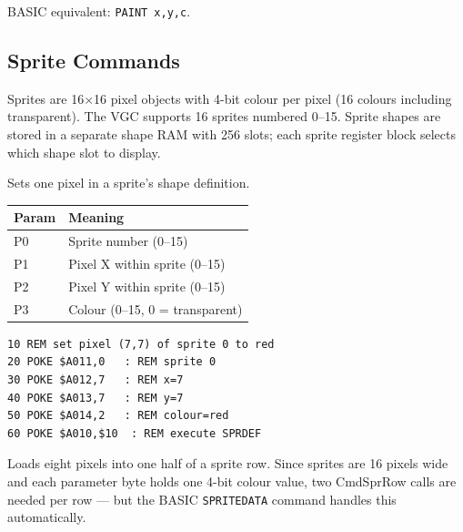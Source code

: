 \begin{notebox}
BASIC equivalent: \texttt{PAINT x,y,c}.
\end{notebox}


\subsection{Sprite Commands}
\label{sec:vgc-spr-cmds}

Sprites are 16$\times$16 pixel objects with 4-bit colour per pixel (16 colours
including transparent).  The VGC supports 16 sprites numbered 0--15.  Sprite
shapes are stored in a separate shape RAM with 256 slots; each sprite register
block selects which shape slot to display.



Sets one pixel in a sprite's shape definition.

\begin{center}
\small
\begin{tabular}{@{}ll@{}}
\toprule
\textbf{Param} & \textbf{Meaning} \\
\midrule
P0 & Sprite number (0--15) \\
P1 & Pixel X within sprite (0--15) \\
P2 & Pixel Y within sprite (0--15) \\
P3 & Colour (0--15, 0 = transparent) \\
\bottomrule
\end{tabular}
\end{center}

\begin{lstlisting}
10 REM set pixel (7,7) of sprite 0 to red
20 POKE $A011,0   : REM sprite 0
30 POKE $A012,7   : REM x=7
40 POKE $A013,7   : REM y=7
50 POKE $A014,2   : REM colour=red
60 POKE $A010,$10  : REM execute SPRDEF
\end{lstlisting}



Loads eight pixels into one half of a sprite row.  Since sprites are 16 pixels
wide and each parameter byte holds one 4-bit colour value, two CmdSprRow
calls are needed per row --- but the BASIC \texttt{SPRITEDATA} command handles
this automatically.


